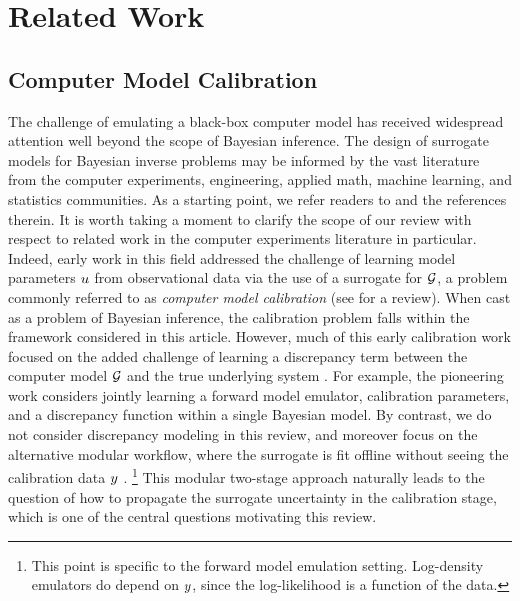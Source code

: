 \documentclass[12pt]{article}
\begin{document}
\section{Related Work} \label{sec:related-work}

\subsection{Computer Model Calibration} \label{sec:computer-model-calibration}
The challenge of emulating a black-box computer model has received widespread attention 
well beyond the scope of Bayesian inference. The design of surrogate models for Bayesian 
inverse problems may be informed by the vast literature from the computer experiments, 
engineering, applied math, machine learning, and statistics communities. As a starting point, 
we refer readers to \citet{gramacy2020surrogates,design_analysis_computer_experiments,SanterCompExp,UQpredCompSci} 
and the references therein. It is worth taking a moment to clarify the scope of our review 
with respect to related work in the computer experiments literature in particular.
Indeed, early work in this field addressed the challenge of learning 
model parameters  $u$ from observational data via the use of a surrogate for $\mathcal{G}$, a problem 
commonly referred to as \textit{computer model calibration} (see \citet{computerModelCalibrationReview}
for a review). When cast as a problem of Bayesian inference, the calibration problem falls within the 
framework considered in this article. However, much of this early calibration work focused on 
the added challenge of learning a discrepancy term between the computer model $\mathcal{G}$ and the 
true underlying system \citep{ModelDiscrepancy,emPostDens,OakleyllikEm}. 
For example, the pioneering work \citet{KOH} considers jointly learning 
a forward model emulator, calibration parameters, and a discrepancy function within a single 
Bayesian model. By contrast, we do not consider discrepancy modeling in this review, and moreover
focus on the alternative modular workflow, where the surrogate is fit offline 
without seeing the calibration data $y$ \citep{modularization}. 
\footnote{This point is specific to the forward model emulation setting. Log-density emulators 
do depend on $y$, since the log-likelihood is a function of the data.}
This modular two-stage approach naturally leads to 
the question of how to propagate the surrogate uncertainty in the calibration stage, which is one 
of the central questions motivating this review.
\end{document}
